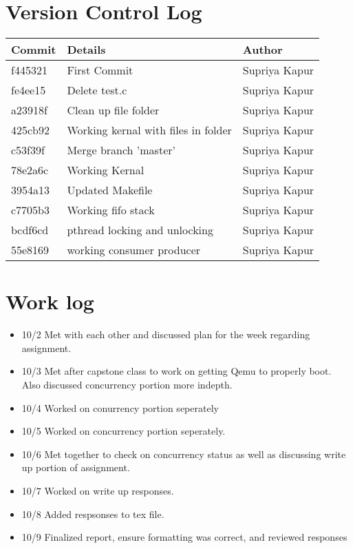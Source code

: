 \documentclass[letterpaper,onecolumn,10pt,titlepage]{IEEEtran}
\begin{document}
\section{Version Control Log}
\begin{tabular}{lll} \textbf{Commit} & \textbf{Details} & \textbf{Author}

\\ \hline
f445321&First Commit&Supriya Kapur\\ \hline
fe4ee15&Delete test.c&Supriya Kapur\\ \hline
a23918f&Clean up file folder&Supriya Kapur\\ \hline
425cb92&Working kernal with files in folder&Supriya Kapur\\ \hline
c53f39f&Merge branch 'master'&Supriya Kapur\\ \hline
78e2a6c&Working Kernal&Supriya Kapur\\ \hline
3954a13&Updated Makefile&Supriya Kapur\\ \hline
c7705b3&Working fifo stack&Supriya Kapur\\ \hline
bcdf6cd&pthread locking and unlocking&Supriya Kapur\\ \hline
55e8169&working consumer producer&Supriya Kapur\\ \hline
\end{tabular}

\par

\section{Work log}
\par
\begin{itemize}
\item 10/2 Met with each other and discussed plan for the week regarding assignment.
\item 10/3 Met after capstone class to work on getting Qemu to properly boot. Also discussed concurrency portion more indepth.
\item 10/4 Worked on conurrency portion seperately
\item 10/5 Worked on concurrency portion seperately.
\item 10/6 Met together to check on concurrency status as well as discussing write up portion of assignment.
\item 10/7 Worked on write up responses.
\item 10/8 Added respsonses to tex file.
\item 10/9 Finalized report, ensure formatting was correct, and reviewed responses
\end{itemize}
\end{document}
